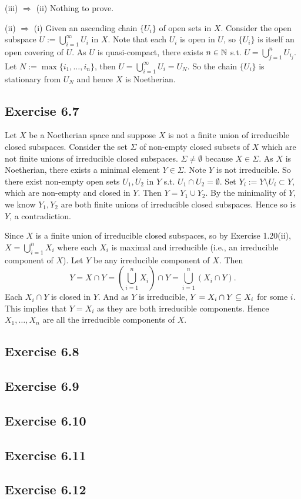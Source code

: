 \documentclass[../A&M.tex]{subfiles}
\begin{document}
(iii) $\Rightarrow$ (ii) Nothing to prove.

(ii) $\Rightarrow$ (i) Given an ascending chain $\{U_i\}$ of open sets in $X$. Consider the open subspace $U:=\bigcup_{i=1}^\infty U_i$ in $X$. Note that each $U_i$ is open in $U$, so $\{U_i\}$ is itself an open covering of $U$. As $U$ is quasi-compact, there exists $n\in\mathbb{N}$ s.t. $U = \bigcup_{j=1}^n U_{i_j}$. Let $N:=\max\{i_1,\ldots,i_n\}$, then $U = \bigcup_{i=1}^\infty U_i = U_N$. So the chain $\{U_i\}$ is stationary from $U_N$ and hence $X$ is Noetherian.

\subsection*{Exercise 6.7}

Let $X$ be a Noetherian space and suppose $X$ is not a finite union of irreducible closed subspaces. Consider the set $\Sigma$ of non-empty closed subsets of $X$ which are not finite unions of irreducible closed subspaces. $\Sigma \neq \emptyset$ because $X\in\Sigma$. As $X$ is Noetherian, there exists a minimal element $Y\in\Sigma$. Note $Y$ is not irreducible. So there exist non-empty open sets $U_1,U_2$ in $Y$ s.t. $U_1 \cap U_2 = \emptyset$. Set $Y_i := Y \setminus U_i \subset Y$, which are non-empty and closed in $Y$. Then $Y = Y_1 \cup Y_2$. By the minimality of $Y$, we know $Y_1,Y_2$ are both finite unions of irreducible closed subspaces. Hence so is $Y$, a contradiction.

Since $X$ is a finite union of irreducible closed subspaces, so by Exercise 1.20(ii), $X = \bigcup_{i=1}^n X_i$ where each $X_i$ is maximal and irreducible (i.e., an irreducible component of $X$). Let $Y$ be any irreducible component of $X$. Then
$$
Y = X \cap Y = \left( \bigcup_{i=1}^n X_i \right) \cap Y = \bigcup_{i=1}^n (X_i \cap Y).
$$
Each $X_i \cap Y$ is closed in $Y$. And as $Y$ is irreducible, $Y = X_i \cap Y \subseteq X_i$ for some $i$. This implies that $Y = X_i$ as they are both irreducible components. Hence $X_1,\ldots,X_n$ are all the irreducible components of $X$.

\subsection*{Exercise 6.8}

\subsection*{Exercise 6.9}

\subsection*{Exercise 6.10}

\subsection*{Exercise 6.11}

\subsection*{Exercise 6.12}
\phantom{}
\end{document}
